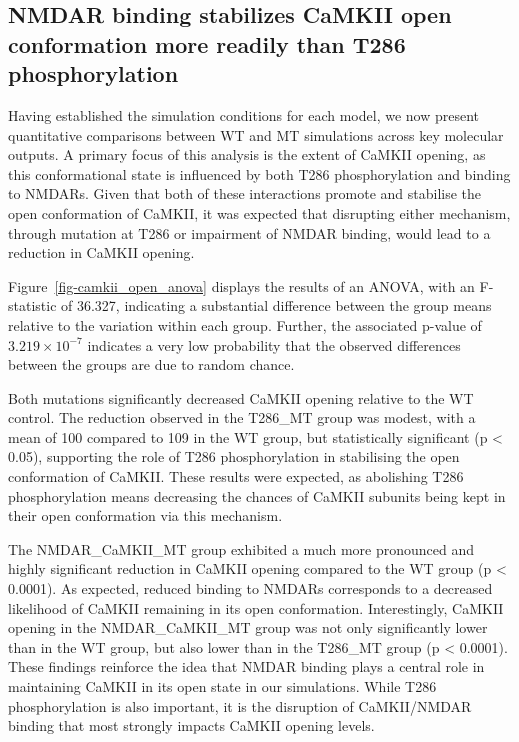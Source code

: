 \documentclass[
  11pt,
  letterpaper,
]{scrreprt}
\begin{document}
\subsection{NMDAR binding stabilizes CaMKII open conformation more
readily than T286
phosphorylation}\label{nmdar-binding-stabilizes-camkii-open-conformation-more-readily-than-t286-phosphorylation}

Having established the simulation conditions for each model, we now
present quantitative comparisons between WT and MT simulations across
key molecular outputs. A primary focus of this analysis is the extent of
CaMKII opening, as this conformational state is influenced by both T286
phosphorylation and binding to NMDARs. Given that both of these
interactions promote and stabilise the open conformation of CaMKII, it
was expected that disrupting either mechanism, through mutation at T286
or impairment of NMDAR binding, would lead to a reduction in CaMKII
opening.

Figure~\ref{fig-camkii_open_anova} displays the results of an ANOVA,
with an F-statistic of 36.327, indicating a substantial difference
between the group means relative to the variation within each group.
Further, the associated p-value of \(3.219 \times 10^{-7}\) indicates a
very low probability that the observed differences between the groups
are due to random chance.

Both mutations significantly decreased CaMKII opening relative to the WT
control. The reduction observed in the T286\_MT group was modest, with a
mean of 100 compared to 109 in the WT group, but statistically
significant (p \textless{} 0.05), supporting the role of T286
phosphorylation in stabilising the open conformation of CaMKII. These
results were expected, as abolishing T286 phosphorylation means
decreasing the chances of CaMKII subunits being kept in their open
conformation via this mechanism.

The NMDAR\_CaMKII\_MT group exhibited a much more pronounced and highly
significant reduction in CaMKII opening compared to the WT group (p
\textless{} 0.0001). As expected, reduced binding to NMDARs corresponds
to a decreased likelihood of CaMKII remaining in its open conformation.
Interestingly, CaMKII opening in the NMDAR\_CaMKII\_MT group was not
only significantly lower than in the WT group, but also lower than in
the T286\_MT group (p \textless{} 0.0001). These findings reinforce the
idea that NMDAR binding plays a central role in maintaining CaMKII in
its open state in our simulations. While T286 phosphorylation is also
important, it is the disruption of CaMKII/NMDAR binding that most
strongly impacts CaMKII opening levels.
\end{document}
